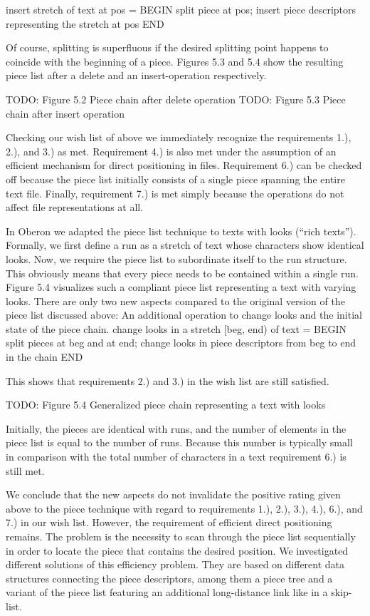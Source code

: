 insert stretch of text at pos = BEGIN
  split piece at pos;
  insert piece descriptors representing the stretch at pos
END
\endtt

\noindent Of course, splitting is superfluous if the desired splitting point
happens to coincide with the beginning of a piece. Figures 5.3 and 5.4
show the resulting piece list after a delete and an insert-operation
respectively.

TODO: Figure 5.2 Piece chain after delete operation
TODO: Figure 5.3 Piece chain after insert operation

Checking our wish list of above we immediately recognize the
requirements 1.), 2.), and 3.) as met. Requirement 4.) is also met
under the assumption of an efficient mechanism for direct positioning
in files. Requirement 6.) can be checked off because the piece list
initially consists of a single piece spanning the entire text
file. Finally, requirement 7.) is met simply because the operations do
not affect file representations at all.

In Oberon we adapted the piece list technique to texts with looks
(``rich texts''). Formally, we first define a run as a stretch of text
whose characters show identical looks. Now, we require the piece list
to subordinate itself to the run structure. This obviously means that
every piece needs to be contained within a single run. Figure 5.4
visualizes such a compliant piece list representing a text with
varying looks. There are only two new aspects compared to the original
version of the piece list discussed above: An additional operation to
change looks and the initial state of the piece chain.
\begintt
change looks in a stretch [beg, end) of text = BEGIN
  split pieces at beg and at end;
  change looks in piece descriptors from beg to end in the chain
END
\endtt

\noindent This shows that requirements 2.) and 3.) in the wish list are still satisfied.

TODO: Figure 5.4 Generalized piece chain representing a text with looks

Initially, the pieces are identical with runs, and the number of elements in the piece list is equal to the number of runs. Because this number is typically small in comparison with the total number of characters in a text requirement 6.) is still met.

We conclude that the new aspects do not invalidate the positive rating given above to the piece technique with regard to requirements 1.), 2.), 3.), 4.), 6.), and 7.) in our wish list. However, the requirement of efficient direct positioning remains. The problem is the necessity to scan through the piece list sequentially in order to locate the piece that contains the desired position. We investigated different solutions of this efficiency problem. They are based on different data structures connecting the piece descriptors, among them a piece tree and a variant of the piece list featuring an additional long-distance link like in a skip-list.

